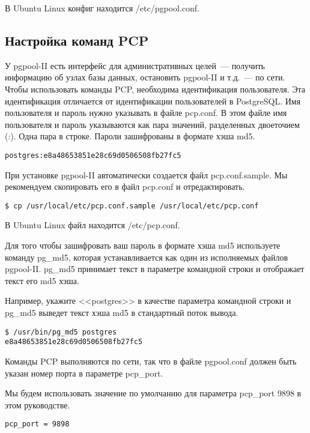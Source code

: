В Ubuntu Linux конфиг находится /etc/pgpool.conf.

\subsection{Настройка команд PCP}
У pgpool-II есть интерфейс для административных целей~--- получить информацию об узлах базы данных, 
остановить pgpool-II и т.д.~--- по сети. Чтобы использовать команды PCP, необходима идентификация пользователя. 
Эта идентификация отличается от идентификации пользователей в PostgreSQL. Имя пользователя и пароль нужно указывать в 
файле pcp.conf. В этом файле имя пользователя и пароль указываются как пара значений, разделенных двоеточием (:). 
Одна пара в строке. Пароли зашифрованы в формате хэша md5.
\begin{lstlisting}[label=lst:pgpool6,caption=Настройка команд PCP]
postgres:e8a48653851e28c69d0506508fb27fc5
\end{lstlisting}

При установке pgpool-II автоматически создается файл pcp.conf.sample. 
Мы рекомендуем скопировать его в файл pcp.conf и отредактировать.
\begin{lstlisting}[label=lst:pgpool7,caption=Настройка команд PCP]
$ cp /usr/local/etc/pcp.conf.sample /usr/local/etc/pcp.conf
\end{lstlisting}

В Ubuntu Linux файл находится /etc/pcp.conf.

Для того чтобы зашифровать ваш пароль в формате хэша md5 используете команду pg\_md5, которая устанавливается как один из 
исполняемых файлов pgpool-II. pg\_md5 принимает текст в параметре командной строки и отображает текст его md5 хэша.

Например, укажите <<postgres>> в качестве параметра командной строки и pg\_md5 выведет текст хэша md5 в стандартный поток вывода.
\begin{lstlisting}[label=lst:pgpool8,caption=Настройка команд PCP]
$ /usr/bin/pg_md5 postgres
e8a48653851e28c69d0506508fb27fc5
\end{lstlisting}

Команды PCP выполняются по сети, так что в файле pgpool.conf должен быть указан номер порта в параметре pcp\_port.

Мы будем использовать значение по умолчанию для параметра pcp\_port 9898 в этом руководстве.
\begin{lstlisting}[label=lst:pgpool9,caption=Настройка команд PCP]
pcp_port = 9898
\end{lstlisting}


